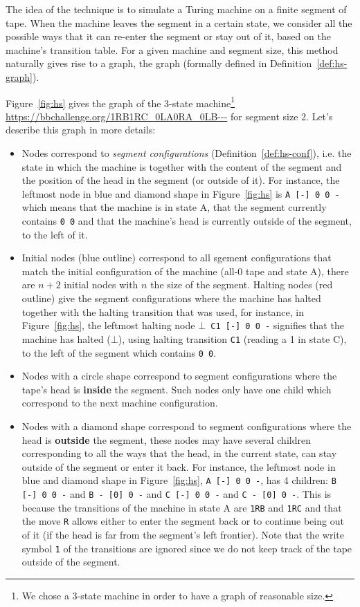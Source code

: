 The idea of the \HS technique is to simulate a Turing machine on a finite segment of tape. When the machine leaves the segment in a certain state, we consider all the possible ways that it can re-enter the segment or stay out of it, based on the machine's transition table. For a given machine and segment size, this method naturally gives rise to a graph, the \HS graph (formally defined in Definition~\ref{def:hs-graph}).

Figure~\ref{fig:hs} gives the \HS graph of the 3-state machine\footnote{We chose a 3-state machine in order to have a graph of reasonable size.} \url{https://bbchallenge.org/1RB1RC_0LA0RA_0LB---} for segment size 2. Let's describe this graph in more details:

\begin{itemize}
  \item Nodes correspond to \textit{segment configurations} (Definition~\ref{def:hs-conf}), i.e. the state in which the machine is together with the content of the segment and the position of the head in the segment (or outside of it). For instance, the leftmost node in blue and diamond shape in Figure~\ref{fig:hs} is \texttt{A [-] 0 0 -} which means that the machine is in state A, that the segment currently contains \texttt{0 0} and that the machine's head is currently outside of the segment, to the left of it.

  \item Initial nodes (blue outline) correspond to all sgement configurations that match the initial configuration of the machine (all-0 tape and state A), there are $n+2$ initial nodes with $n$ the size of the segment. Halting nodes (red outline) give the segment configurations where the machine has halted together with the halting transition that was used, for instance, in Figure~\ref{fig:hs}, the leftmost halting node \texttt{$\bot$ C1 [-] 0 0 -} signifies that the machine has halted ($\bot$), using halting transition \texttt{C1} (reading a 1 in state C), to the left of the segment which contains \texttt{0 0}.

  \item Nodes with a circle shape correspond to segment configurations where the tape's head is \textbf{inside} the segment. Such nodes only have one child which correspond to the next machine configuration.

  \item Nodes with a diamond shape correspond to segment configurations where the head is \textbf{outside} the segment, these nodes may have several children corresponding to all the ways that the head, in the current state, can stay outside of the segment or enter it back. For instance, the leftmost node in blue and diamond shape in Figure~\ref{fig:hs}, \texttt{A [-] 0 0 -}, has 4 children: \texttt{B [-] 0 0 -} and \texttt{B - [0] 0 -} and \texttt{C [-] 0 0 -} and \texttt{C - [0] 0 -}. This is because the transitions of the machine in state A are \texttt{1RB} and \texttt{1RC} and that the move \texttt{R} allows either to enter the segment back or to continue being out of it (if the head is far from the segment's left frontier). Note that the write symbol \texttt{1} of the transitions are ignored since we do not keep track of the tape outside of the segment.


\end{itemize}
